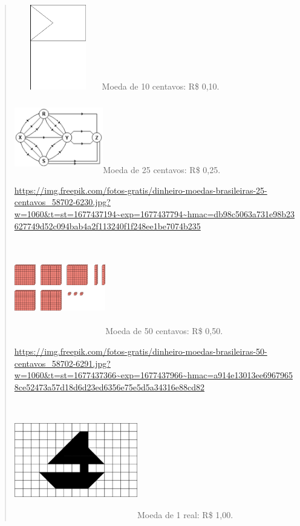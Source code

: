 \begin{enumerate}
\begin{escolha}
\begin{enumerate}
\begin{itemize}
\begin{itemize}
\begin{escolha}
\begin{quote}
\includegraphics[width=1.50833in,height=1.45668in]{media/image74.png}Moeda
de 10 centavos: R\$ 0,10.

\includegraphics[width=1.52500in,height=1.24749in]{media/image75.png}Moeda
de 25 centavos: R\$ 0,25.

\url{https://img.freepik.com/fotos-gratis/dinheiro-moedas-brasileiras-25-centavos_58702-6230.jpg?w=1060\&t=st=1677437194~exp=1677437794~hmac=db98c5063a731e98b23627749d52c094bab4a2f113240f1f248ee1be7074b235}

\includegraphics[width=1.56667in,height=1.61849in]{media/image76.png}Moeda
de 50 centavos: R\$ 0,50.

\url{https://img.freepik.com/fotos-gratis/dinheiro-moedas-brasileiras-50-centavos_58702-6291.jpg?w=1060\&t=st=1677437366~exp=1677437966~hmac=a914e13013ee69679658ce52473a57d18d6d23ed6356e75e5d5a34316e88cd82}

\includegraphics[width=2.11667in,height=2.01180in]{media/image77.png}Moeda
de 1 real: R\$ 1,00.


\end{quote}
\end{escolha}
\end{itemize}
\end{itemize}
\end{enumerate}
\end{escolha}
\end{enumerate}
